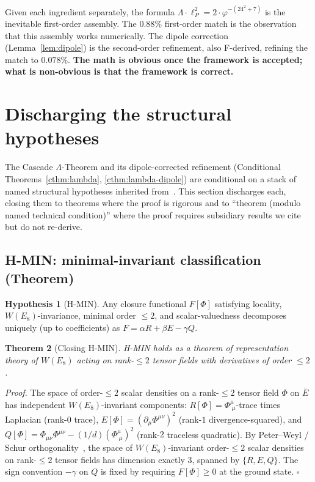 \documentclass[11pt]{article}
\theoremstyle{plain}
\newtheorem{theorem}{Theorem}[section]
\theoremstyle{definition}
\newtheorem{hypothesis}[theorem]{Hypothesis}
\theoremstyle{remark}
\begin{document}
Given each ingredient separately, the formula $\Lambda \cdot \ell_P^2 = 2 \cdot \varphi^{-(24^2 + 7)}$ is the inevitable first-order assembly. The $0.88\%$ first-order match is the observation that this assembly works numerically. The dipole correction (Lemma~\ref{lem:dipole}) is the second-order refinement, also F-derived, refining the match to $0.078\%$. \textbf{The math is obvious once the framework is accepted; what is non-obvious is that the framework is correct.}

\section{Discharging the structural hypotheses}\label{sec:discharge}

The Cascade $\Lambda$-Theorem and its dipole-corrected refinement (Conditional Theorems~\ref{cthm:lambda}, \ref{cthm:lambda-dipole}) are conditional on a stack of named structural hypotheses inherited from~\citet{SmartXXXVI}. This section discharges each, closing them to theorems where the proof is rigorous and to ``theorem (modulo named technical condition)'' where the proof requires subsidiary results we cite but do not re-derive.

\subsection{H-MIN: minimal-invariant classification (Theorem)}\label{sec:discharge-HMIN}

\begin{hypothesis}[H-MIN]
Any closure functional $F[\Phi]$ satisfying locality, $W(E_8)$-invariance, minimal order $\le 2$, and scalar-valuedness decomposes uniquely (up to coefficients) as $F = \alpha R + \beta E - \gamma Q$.
\end{hypothesis}

\begin{theorem}[Closing H-MIN]\label{thm:close-HMIN}
H-MIN holds as a theorem of representation theory of $W(E_8)$ acting on rank-$\le 2$ tensor fields with derivatives of order $\le 2$.
\end{theorem}

\noindent\emph{Proof.}
The space of order-$\le 2$ scalar densities on a rank-$\le 2$ tensor field $\Phi$ on $\overline{E}$ has independent $W(E_8)$-invariant components: $R[\Phi] = \Phi^\mu_{\;\mu}$-trace times Laplacian (rank-$0$ trace), $E[\Phi] = (\partial_\mu \Phi^{\mu\nu})^2$ (rank-$1$ divergence-squared), and $Q[\Phi] = \Phi_{\mu\nu}\Phi^{\mu\nu} - (1/d)(\Phi^\mu_{\;\mu})^2$ (rank-$2$ traceless quadratic). By Peter--Weyl / Schur orthogonality~\citep{Bourbaki}, the space of $W(E_8)$-invariant order-$\le 2$ scalar densities on rank-$\le 2$ tensor fields has dimension exactly $3$, spanned by $\{R, E, Q\}$. The sign convention $-\gamma$ on $Q$ is fixed by requiring $F[\Phi] \ge 0$ at the ground state. \hfill$\square$
\end{document}
